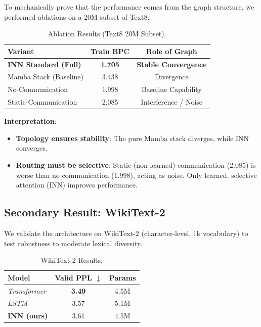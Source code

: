 \documentclass{article}
\begin{document}
To mechanically prove that the performance comes from the graph structure, we performed ablations on a 20M subset of Text8.

\begin{table}[H]
\centering
\caption{Ablation Results (Text8 20M Subset).}
\begin{tabular}{lcc}
\toprule
\textbf{Variant} & \textbf{Train BPC} & \textbf{Role of Graph} \\
\midrule
\textbf{INN Standard (Full)} & \textbf{1.705} & \textbf{Stable Convergence} \\
Mamba Stack (Baseline) & 3.438 & Divergence \\
No-Communication & 1.998 & Baseline Capability \\
Static-Communication & 2.085 & Interference / Noise \\
\bottomrule
\end{tabular}
\label{tab:ablation}
\end{table}

\textbf{Interpretation}:
\begin{itemize}
    \item \textbf{Topology ensures stability}: The pure Mamba stack diverges, while INN converges.
    \item \textbf{Routing must be selective}: Static (non-learned) communication (2.085) is worse than no communication (1.998), acting as noise. Only learned, selective attention (INN) improves performance.
\end{itemize}

\subsection{Secondary Result: WikiText-2}

We validate the architecture on WikiText-2 (character-level, 1k vocabulary) to test robustness to moderate lexical diversity.

\begin{table}[H]
\centering
\caption{WikiText-2 Results.}
\begin{tabular}{lcc}
\toprule
\textbf{Model} & \textbf{Valid PPL} $\downarrow$ & \textbf{Params} \\
\midrule
\textit{Transformer} & \textbf{3.49} & 4.5M \\
\textit{LSTM} & 3.57 & 5.1M \\
\textbf{INN (ours)} & 3.61 & 4.5M \\
\bottomrule
\end{tabular}
\label{tab:wikitext_results}
\end{table}
\end{document}

